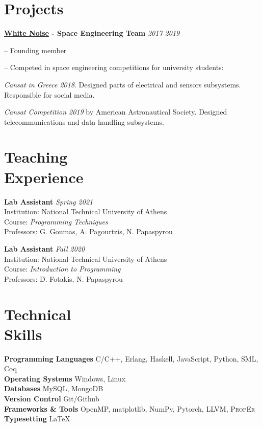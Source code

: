 \documentclass[margin, 10.5pt]{res}
\newcommand{\field}[2]{\noindent \textbf{#1} \hfill #2 \\}
\begin{document}
\begin{resume}
\section{Projects}

\textbf{\href{https://whitenoise.gr/}{White Noise} - Space Engineering Team} \hfill \emph{2017-2019}
\begin{compactitem}
\item[--] Founding member
\item[--] Competed in space engineering competitions for university students:
\begin{compactitem}
\item \textit{Cansat in Greece 2018}. Designed parts of electrical and sensors subsystems. Responsible for social media.
\item \textit{Cansat Competition 2019} by American Astronautical Society. Designed telecommunications and data handling subsystems.
\end{compactitem}
\end{compactitem}

\section{Teaching \\ Experience}

\field{Lab Assistant}{\emph{Spring 2021}}
Institution: National Technical University of Athens \\
Course: \textit{Programming Techniques} \\
Professors: G. Goumas, A. Pagourtzis, N. Papaspyrou

\field{Lab Assistant}{\emph{Fall 2020}}
Institution: National Technical University of Athens \\
Course: \textit{Introduction to Programming} \\
Professors: D. Fotakis, N. Papaspyrou


\section{Technical \\ Skills}

\field{Programming Languages}  {C/C++, Erlang, Haskell, JavaScript, Python, SML, Coq} 
\field{Operating Systems} {Windows, Linux} 
\field{Databases} {MySQL, MongoDB}
\field{Version Control} {Git/Github}
\field{Frameworks \& Tools} {OpenMP, matplotlib, NumPy, Pytorch, LLVM, \textsc{PropEr}}
\field{Typesetting} {\LaTeX}



\end{resume}
\end{document}
